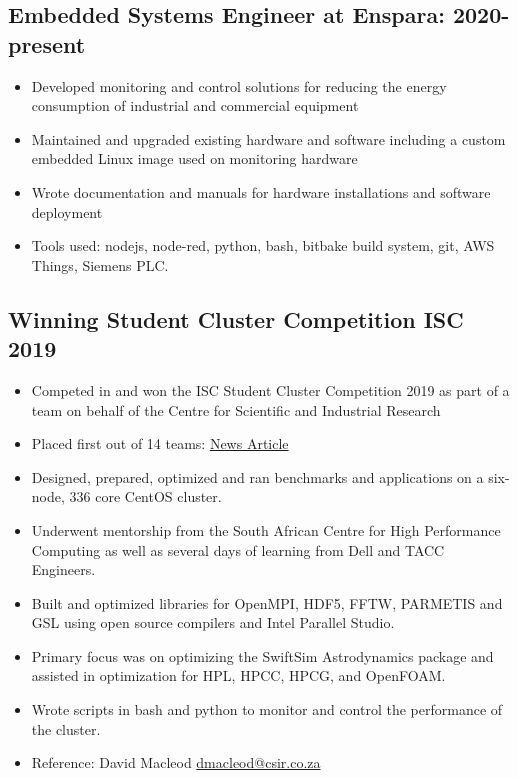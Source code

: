 \documentclass[10pt,a4paper,notitlepage]{article}
\begin{document}
\subsection*{Embedded Systems Engineer at Enspara: 2020-present}
\begin{itemize}[noitemsep]
	\setlength\itemsep{0.02em}
    \item Developed monitoring and control solutions for reducing the energy consumption of industrial and commercial equipment
    \item Maintained and upgraded existing hardware and software including a custom embedded Linux image used on monitoring hardware
    \item Wrote documentation and manuals for hardware installations and software deployment
    \item Tools used: nodejs, node-red, python, bash, bitbake build system, git, AWS Things, Siemens PLC.
\end{itemize}

\subsection*{Winning Student Cluster Competition ISC 2019}
\begin{itemize}[noitemsep]
	\setlength\itemsep{0.02em}
    \item Competed in and won the ISC Student Cluster Competition 2019 as part of a team on behalf of the Centre for Scientific and Industrial Research
    \item Placed first out of 14 teams: \href{https://www.chpc.ac.za/index.php/news2/241-south-africa-wins-international-student-cluster-competition-for-the-fourth-time}{News Article}
    \item Designed, prepared, optimized and ran benchmarks and applications on a six-node, 336 core CentOS cluster.
    \item Underwent mentorship from the South African Centre for High Performance Computing as well
        as several days of learning from Dell and TACC Engineers.
    \item Built and optimized libraries for OpenMPI, HDF5, FFTW, PARMETIS and GSL using open source compilers and Intel Parallel Studio.
    \item Primary focus was on optimizing the SwiftSim Astrodynamics package and assisted in optimization for HPL, HPCC, HPCG, and OpenFOAM.
    \item Wrote scripts in bash and python to monitor and control the performance of the cluster. 
    \item Reference: David Macleod \href{mailto:dmacleod@csir.co.za}{dmacleod@csir.co.za}
\end{itemize}
\end{document}
